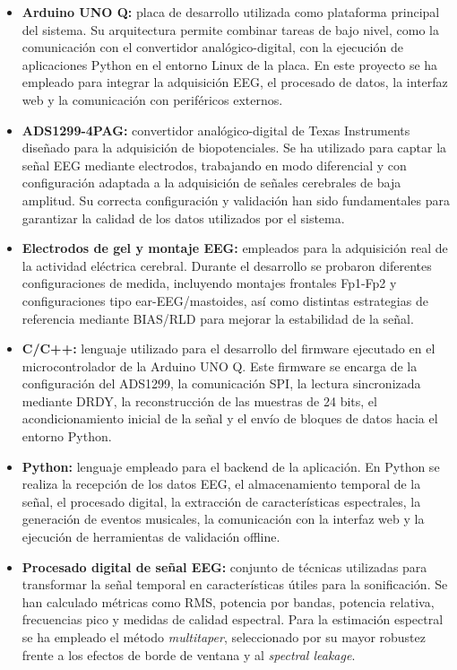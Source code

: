 \documentclass[../main.tex]{subfiles}
\begin{document}
\begin{itemize}

    \item \textbf{Arduino UNO Q:} placa de desarrollo utilizada como plataforma principal del sistema. Su arquitectura permite combinar tareas de bajo nivel, como la comunicación con el convertidor analógico-digital, con la ejecución de aplicaciones Python en el entorno Linux de la placa. En este proyecto se ha empleado para integrar la adquisición EEG, el procesado de datos, la interfaz web y la comunicación con periféricos externos.

    \item \textbf{ADS1299-4PAG:} convertidor analógico-digital de Texas Instruments diseñado para la adquisición de biopotenciales. Se ha utilizado para captar la señal EEG mediante electrodos, trabajando en modo diferencial y con configuración adaptada a la adquisición de señales cerebrales de baja amplitud. Su correcta configuración y validación han sido fundamentales para garantizar la calidad de los datos utilizados por el sistema.

    \item \textbf{Electrodos de gel y montaje EEG:} empleados para la adquisición real de la actividad eléctrica cerebral. Durante el desarrollo se probaron diferentes configuraciones de medida, incluyendo montajes frontales Fp1-Fp2 y configuraciones tipo ear-EEG/mastoides, así como distintas estrategias de referencia mediante BIAS/RLD para mejorar la estabilidad de la señal.

    \item \textbf{C/C++:} lenguaje utilizado para el desarrollo del firmware ejecutado en el microcontrolador de la Arduino UNO Q. Este firmware se encarga de la configuración del ADS1299, la comunicación SPI, la lectura sincronizada mediante DRDY, la reconstrucción de las muestras de 24 bits, el acondicionamiento inicial de la señal y el envío de bloques de datos hacia el entorno Python.

    \item \textbf{Python:} lenguaje empleado para el backend de la aplicación. En Python se realiza la recepción de los datos EEG, el almacenamiento temporal de la señal, el procesado digital, la extracción de características espectrales, la generación de eventos musicales, la comunicación con la interfaz web y la ejecución de herramientas de validación offline.

    \item \textbf{Procesado digital de señal EEG:} conjunto de técnicas utilizadas para transformar la señal temporal en características útiles para la sonificación. Se han calculado métricas como RMS, potencia por bandas, potencia relativa, frecuencias pico y medidas de calidad espectral. Para la estimación espectral se ha empleado el método \textit{multitaper}, seleccionado por su mayor robustez frente a los efectos de borde de ventana y al \textit{spectral leakage}.


\end{itemize}
\end{document}
